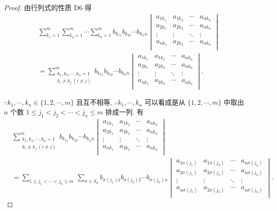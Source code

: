 \documentclass[color=black,device=normal,lang=cn,mode=geye]{elegantnote}
\begin{document}
\begin{proof}
    由行列式的性质 D6 得
    \begin{align*}
        & \sum_{k_1=1}^m\sum_{k_2=1}^m\cdots\sum_{k_n=1}^mb_{k_11}b_{k_22}\cdots b_{k_nn}\begin{vmatrix}
            a_{1k_1} & a_{1k_2} & \cdots & a_{nk_n} \\
            a_{2k_1} & a_{2k_2} & \cdots & a_{nk_n} \\
            \vdots & \vdots & \ddots & \vdots \\
            a_{nk_1} & a_{2k_2} & \cdots & a_{nk_n} \\
        \end{vmatrix} \\
        & =\sum_{\substack{k_1,k_2,\cdots,k_n=1\\k_i\neq k_j\ (i\neq j)}}^mb_{k_11}b_{k_22}\cdots b_{k_nn}\begin{vmatrix}
            a_{1k_1} & a_{1k_2} & \cdots & a_{nk_n} \\
            a_{2k_1} & a_{2k_2} & \cdots & a_{nk_n} \\
            \vdots & \vdots & \ddots & \vdots \\
            a_{nk_1} & a_{2k_2} & \cdots & a_{nk_n} \\
        \end{vmatrix}.
    \end{align*}

    $\because k_1,\cdots,k_n\in\{1,2,\cdots,m\}$ 且互不相等, $\therefore k_1,\cdots,k_n$ 可以看成是从 $\{1,2,\cdots,m\}$ 中取出 $n$ 个数 $1\leq j_1<j_2<\cdots<j_n\leq m$ 排成一列. 有
    \begin{align*}
        & \sum_{\substack{k_1,k_2,\cdots,k_n=1\\k_i\neq k_j\ (i\neq j)}}^mb_{k_11}b_{k_22}\cdots b_{k_nn}\begin{vmatrix}
            a_{1k_1} & a_{1k_2} & \cdots & a_{nk_n} \\
            a_{2k_1} & a_{2k_2} & \cdots & a_{nk_n} \\
            \vdots & \vdots & \ddots & \vdots \\
            a_{nk_1} & a_{2k_2} & \cdots & a_{nk_n} \\
        \end{vmatrix} \\
        & =\sum\limits_{1\leq j_1<\cdots<j_n\leq m}\ \sum_{\sigma\in S_n}b_{\sigma(j_1)1}b_{\sigma(j_2)2}\cdots b_{\sigma(j_n)n}\begin{vmatrix}
            a_{1\sigma(j_1)} & a_{1\sigma(j_2)} & \cdots & a_{n\sigma(j_n)} \\
            a_{2\sigma(j_1)} & a_{2\sigma(j_2)} & \cdots & a_{n\sigma(j_n)} \\
            \vdots & \vdots & \ddots & \vdots \\
            a_{n\sigma(j_1)} & a_{2\sigma(j_2)} & \cdots & a_{n\sigma(j_n)} \\
        \end{vmatrix}.
    \end{align*}


\end{proof}
\end{document}
